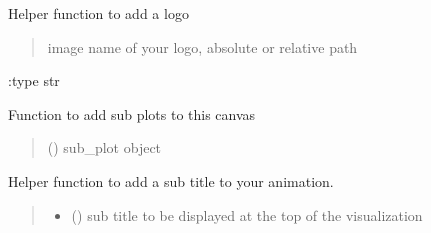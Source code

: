 \documentclass[letterpaper,10pt,english]{sphinxmanual}
\begin{document}
\begin{fulllineitems}
\begin{fulllineitems}
\label{\detokenize{index:sjvisualizer.Canvas.canvas.add_logo}}
\pysigstartsignatures
{}
\pysigstopsignatures
\sphinxAtStartPar
Helper function to add a logo
\begin{quote}\begin{description}
\sphinxAtStartPar
{} \textendash{} image name of your logo, absolute or relative path

\end{description}\end{quote}

\sphinxAtStartPar
:type str

\end{fulllineitems}


\begin{fulllineitems}
\label{\detokenize{index:sjvisualizer.Canvas.canvas.add_sub_plot}}
\pysigstartsignatures
{}
\pysigstopsignatures
\sphinxAtStartPar
Function to add sub plots to this canvas
\begin{quote}\begin{description}
\sphinxAtStartPar
{} () \textendash{} sub\_plot object

\end{description}\end{quote}

\end{fulllineitems}


\begin{fulllineitems}
\label{\detokenize{index:sjvisualizer.Canvas.canvas.add_sub_title}}
\pysigstartsignatures
{}
\pysigstopsignatures
\sphinxAtStartPar
Helper function to add a sub title to your animation.
\begin{quote}\begin{description}
\begin{itemize}
\item {} 
\sphinxAtStartPar
{} () \textendash{} sub title to be displayed at the top of the visualization


\end{itemize}
\end{description}
\end{quote}
\end{fulllineitems}
\end{fulllineitems}
\end{document}
